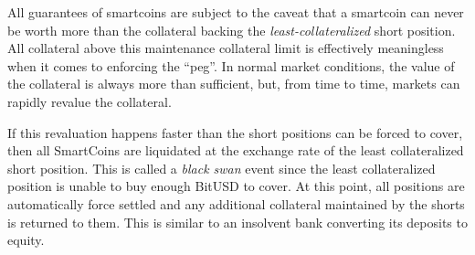 \label{sec:blackswan}

All guarantees of smartcoins are subject to the caveat that a smartcoin can
never be worth more than the collateral backing the \emph{least-collateralized}
short position. All collateral above this maintenance collateral limit is
effectively meaningless when it comes to enforcing the ``peg''. In normal
market conditions, the value of the collateral is always more than sufficient,
but, from time to time, markets can rapidly revalue the collateral.


If this revaluation happens faster than the short positions can be forced to
cover, then all SmartCoins are liquidated at the exchange rate of the least
collateralized short position. This is called a \emph{black swan} event since
the least collateralized position is unable to buy enough BitUSD to cover. At
this point, all positions are automatically force settled and any additional
collateral maintained by the shorts is returned to them. This is similar to an
insolvent bank converting its deposits to equity.
